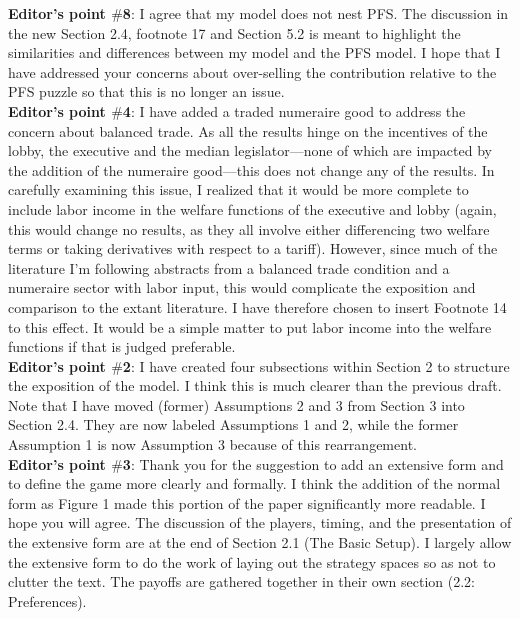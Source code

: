 \documentclass[12pt]{report}
\begin{document}
\textbf{Editor's point $\#$8}: I agree that my model does not nest PFS. The discussion in the new Section 2.4, footnote 17 and Section 5.2 is meant to highlight the similarities and differences between my model and the PFS model. I hope that I have addressed your concerns about over-selling the contribution relative to the PFS puzzle so that this is no longer an issue. \\

\textbf{Editor's point $\#$4}: I have added a traded numeraire good to address the concern about balanced trade. As all the results hinge on the incentives of the lobby, the executive and the median legislator---none of which are impacted by the addition of the numeraire good---this does not change any of the results. In carefully examining this issue, I realized that it would be more complete to include labor income in the welfare functions of the executive and lobby (again, this would change no results, as they all involve either differencing two welfare terms or taking derivatives with respect to a tariff). However, since much of the literature I'm following abstracts from a balanced trade condition and a numeraire sector with labor input, this would complicate the exposition and comparison to the extant literature. I have therefore chosen to insert Footnote 14 to this effect. It would be a simple matter to put labor income into the welfare functions if that is judged preferable. \\

\textbf{Editor's point $\#$2}: I have created four subsections within Section 2 to structure the exposition of the model. I think this is much clearer than the previous draft. Note that I have moved (former) Assumptions 2 and 3 from Section 3 into Section 2.4. They are now labeled Assumptions 1 and 2, while the former Assumption 1 is now Assumption 3 because of this rearrangement. \\

\textbf{Editor's point $\#$3}: Thank you for the suggestion to add an extensive form and to define the game more clearly and formally. I think the addition of the normal form as Figure 1 made this portion of the paper significantly more readable. I hope you will agree. The discussion of the players, timing, and the presentation of the extensive form are at the end of Section 2.1 (The Basic Setup). I largely allow the extensive form to do the work of laying out the strategy spaces so as not to clutter the text. The payoffs are gathered together in their own section (2.2: Preferences). \\
\end{document}

